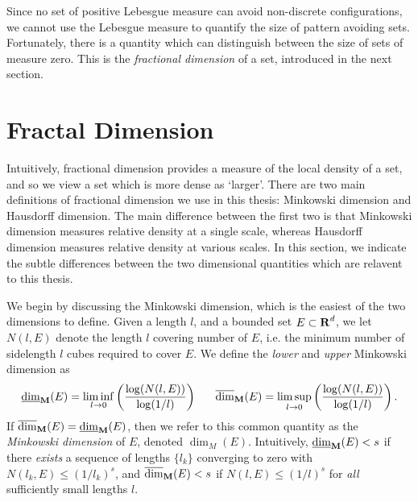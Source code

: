 Since no set of positive Lebesgue measure can avoid non-discrete configurations, we cannot use the Lebesgue measure to quantify the size of pattern avoiding sets. Fortunately, there is a quantity which can distinguish between the size of sets of measure zero. This is the \emph{fractional dimension} of a set, introduced in the next section.







\section{Fractal Dimension}

Intuitively, fractional dimension provides a measure of the local density of a set, and so we view a set which is more dense as `larger'. There are two main definitions of fractional dimension we use in this thesis: Minkowski dimension and Hausdorff dimension. The main difference between the first two is that Minkowski dimension measures relative density at a single scale, whereas Hausdorff dimension measures relative density at various scales. In this section, we indicate the subtle differences between the two dimensional quantities which are relavent to this thesis.

We begin by discussing the Minkowski dimension, which is the easiest of the two dimensions to define. Given a length $l$, and a bounded set $E \subset \operatorname{\mathbf{R}}^d$, we let $N(l,E)$ denote the length $l$ covering number of $E$, i.e. the minimum number of sidelength $l$ cubes required to cover $E$. We define the \emph{lower} and \emph{upper} Minkowski dimension as
%
\[ \operatorname{\underline{\dim}_{\mathbf{M}}}(E) = \liminf_{l \to 0} \left( \frac{\log(N(l,E))}{\log(1/l)} \right)\ \ \ \ \ \operatorname{\overline{\dim}_{\mathbf{M}}}(E) = \limsup_{l \to 0} \left( \frac{\log(N(l,E))}{\log(1/l)} \right). \]
%
If $\operatorname{\overline{\dim}_{\mathbf{M}}}(E) = \operatorname{\underline{\dim}_{\mathbf{M}}}(E)$, then we refer to this common quantity as the \emph{Minkowski dimension} of $E$, denoted $\dim_M(E)$. Intuitively, $\operatorname{\underline{\dim}_{\mathbf{M}}}(E) < s$ if there {\it exists} a sequence of lengths $\{ l_k \}$ converging to zero with $N(l_k,E) \leq (1/l_k)^s$, and $\operatorname{\overline{\dim}_{\mathbf{M}}}(E) < s$ if $N(l,E) \leq (1/l)^s$ for \emph{all} sufficiently small lengths $l$.


